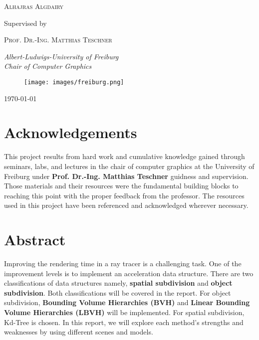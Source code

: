 \documentclass[11pt,a4paper]{article}
\begin{document}
\begin{titlepage}
	{\scshape\Large Alhajras Algdairy \\} %
	
			\vspace{0.5\baselineskip} %

	Supervised by
	
	\vspace{0.5\baselineskip} %
	
	{\scshape\Large Prof. Dr.-Ing. Matthias Teschner\\} %

	\vspace{0.5\baselineskip} %
		
	\textit{Albert-Ludwigs-University of Freiburg \\ Chair of Computer Graphics} %
	
		
\begin{figure}[h]	
     \centering
         \texttt{[image: images/freiburg.png]}
\end{figure}
	\vfill %
	
	


	
	\vspace{0.3\baselineskip} %
	
	\today%
	

\end{titlepage}

\clearpage

\section*{Acknowledgements}
This project results from hard work and cumulative knowledge gained through seminars, labs, and lectures in the chair of computer graphics at the University of Freiburg under \textbf{Prof. Dr.-Ing. Matthias Teschner} guidness and supervision. Those materials and their resources were the fundamental building blocks to reaching this point with the proper feedback from the professor. The resources used in this project have been referenced and acknowledged wherever necessary.
\\
\section*{Abstract}
Improving the rendering time in a ray tracer is a challenging task. One of the improvement levels is to implement an acceleration data structure. There are two classifications of data structures namely, \textbf{spatial subdivision} and \textbf{object subdivision}. Both classifications will be covered in the report. For object subdivision, \textbf{Bounding Volume Hierarchies (BVH)} and \textbf{Linear Bounding Volume Hierarchies (LBVH)} will be implemented. For spatial subdivision, Kd-Tree is chosen. In this report, we will explore each method's strengths and weaknesses by using different scenes and models.
  
\end{document}
